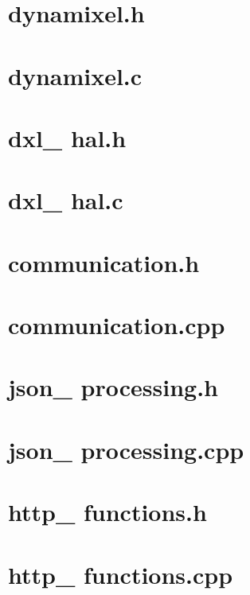 \documentclass{book}
\begin{document}
\section{dynamixel.h}

\section{dynamixel.c}


\section{dxl\_ hal.h}

\section{dxl\_ hal.c}


\section{communication.h}

\section{communication.cpp}


\section{json\_ processing.h}

\section{json\_ processing.cpp}


\section{http\_ functions.h}

\section{http\_ functions.cpp}

\end{document}
